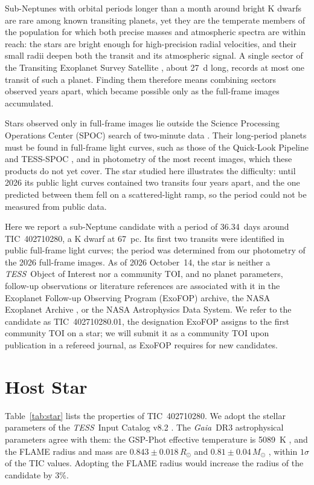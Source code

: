 \documentclass[twocolumn]{aastex631}
\newcommand{\tic}{TIC~402710280}
\newcommand{\planet}{TIC~402710280.01}
\newcommand{\tess}{\textit{TESS}}
\newcommand{\gaia}{\textit{Gaia}}
\newcommand{\rsun}{R_\odot}
\newcommand{\msun}{M_\odot}
\begin{document}
Sub-Neptunes with orbital periods longer than a month around bright K dwarfs are rare among known transiting planets, yet they are the temperate members of the population for which both precise masses and atmospheric spectra are within reach: the stars are bright enough for high-precision radial velocities, and their small radii deepen both the transit and its atmospheric signal. A single sector of the Transiting Exoplanet Survey Satellite \citep[\tess;][]{Ricker2015}, about 27~d long, records at most one transit of such a planet. Finding them therefore means combining sectors observed years apart, which became possible only as the full-frame images accumulated.

Stars observed only in full-frame images lie outside the Science Processing Operations Center (SPOC) search of two-minute data \citep{Jenkins2016}. Their long-period planets must be found in full-frame light curves, such as those of the Quick-Look Pipeline \citep[QLP;][]{Huang2020a, Huang2020b} and TESS-SPOC \citep{Caldwell2020}, and in photometry of the most recent images, which these products do not yet cover. The star studied here illustrates the difficulty: until 2026 its public light curves contained two transits four years apart, and the one predicted between them fell on a scattered-light ramp, so the period could not be measured from public data.

Here we report a sub-Neptune candidate with a period of 36.34~days around \tic, a K dwarf at 67~pc. Its first two transits were identified in public full-frame light curves; the period was determined from our photometry of the 2026 full-frame images. As of 2026 October~14, the star is neither a \tess\ Object of Interest \citep[TOI;][]{Guerrero2021} nor a community TOI, and no planet parameters, follow-up observations or literature references are associated with it in the Exoplanet Follow-up Observing Program (ExoFOP) archive, the NASA Exoplanet Archive \citep{Akeson2013}, or the NASA Astrophysics Data System. We refer to the candidate as \planet, the designation ExoFOP assigns to the first community TOI on a star; we will submit it as a community TOI upon publication in a refereed journal, as ExoFOP requires for new candidates.

\section{Host Star} \label{sec:star}

Table~\ref{tab:star} lists the properties of \tic. We adopt the stellar parameters of the \tess\ Input Catalog v8.2 \citep[TIC;][]{Stassun2019}. The \gaia\ DR3 \citep{Gaia2016, GaiaDR3} astrophysical parameters agree with them: the GSP-Phot effective temperature is 5089~K \citep{Andrae2023}, and the FLAME radius and mass are $0.843 \pm 0.018\,\rsun$ and $0.81 \pm 0.04\,\msun$ \citep{Creevey2023}, within $1\sigma$ of the TIC values. Adopting the FLAME radius would increase the radius of the candidate by 3\%.
\end{document}
